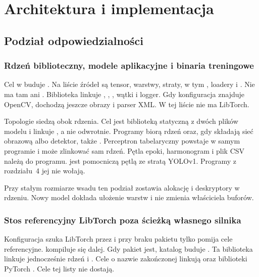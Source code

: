 \chapter{Architektura i implementacja}

\section{Podział odpowiedzialności}

\subsection{Rdzeń biblioteczny, modele aplikacyjne i binaria treningowe}

Cel  w  buduje . Na liście źródeł są tensor, warstwy, straty, w tym , loadery i . Nie ma tam  ani . Biblioteka linkuje , , , wątki i logger. Gdy konfiguracja znajduje OpenCV, dochodzą jeszcze obrazy i parser XML. W tej liście nie ma LibTorch.

Topologie siedzą obok rdzenia. Cel  jest biblioteką statyczną z dwóch plików modelu i linkuje , a nie odwrotnie. Programy  biorą rdzeń oraz, gdy składają sieć obrazową albo detektor, także . Perceptron tabelaryczny powstaje w samym programie i może zlinkować sam rdzeń. Pętla epoki, harmonogram i plik CSV należą do programu.  jest pomocniczą pętlą ze stratą YOLOv1. Programy z rozdziału~4 jej nie wołają.

Przy stałym rozmiarze wsadu ten podział zostawia alokację i deskryptory w rdzeniu. Nowy model dokłada ułożenie warstw i nie zmienia właściciela buforów.

\subsection{Stos referencyjny LibTorch poza ścieżką własnego silnika}

Konfiguracja szuka LibTorch przez  i przy braku pakietu tylko pomija cele referencyjne.  kompiluje się dalej. Gdy pakiet jest, katalog  buduje . Ta biblioteka linkuje jednocześnie rdzeń i . Cele o nazwie zakończonej  linkują  oraz biblioteki PyTorch \cite{paszke2019pytorch}. Cele  tej listy nie dostają.

